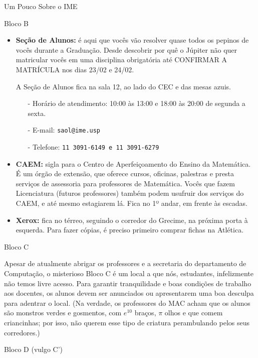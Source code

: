 \begin{secao}{Um Pouco Sobre o IME}
\begin{subsecao}{Bloco B}
\begin{itemize}
\item {\bf Seção de Alunos:} é aqui que vocês vão resolver quase todos os pepinos 
de vocês durante a Graduação. Desde descobrir por quê o Júpiter não quer matricular vocês
em uma disciplina obrigatória até CONFIRMAR A MATRÍCULA nos dias 23/02 e 24/02. %

A Seção de Alunos fica na sala 12, ao lado do CEC e das mesas azuis.
\begin{itemize}
\item[-] Horário de atendimento: 10:00 às 13:00 e 18:00 às 20:00 de segunda a sexta.
\item[-] E-mail: \tt{saol@ime.usp}
\item[-] Telefone: \tt{11 3091-6149} e \tt{11 3091-6279}
\end{itemize}

\item {\bf CAEM:} sigla para o Centro de Aperfeiçoamento do Ensino da Matemática.
É um órgão de extensão, que oferece cursos, oficinas, palestras e presta serviços
de assessoria para professores de Matemática. Vocês que fazem Licenciatura (futuros 
professores) também podem usufruir dos serviços do CAEM, e até mesmo estagiarem lá. 
Fica no 1º andar, em frente às escadas.

\item{\bf Xerox:} fica no térreo, seguindo o corredor do Grecime, na próxima
                  porta à esquerda. Para fazer cópias, é preciso primeiro
                  comprar fichas na Atlética.
\end{itemize}
\end{subsecao}

\begin{subsecao}{Bloco C}

Apesar de atualmente abrigar os professores e a secretaria do departamento de
Computação, o misterioso Bloco C é um local a que nós, estudantes, infelizmente não
temos livre acesso. Para garantir tranquilidade e boas condições de trabalho aos
docentes, os alunos devem ser anunciados ou apresentarem uma boa desculpa para 
adentrar o local. (Na verdade, os professores do MAC acham que os alunos são monstros
verdes e gosmentos, com $e^{10}$ braços, $\pi$ olhos e que comem criancinhas;
por isso, não querem esse tipo de criatura perambulando pelos seus corredores.)

\end{subsecao}

\begin{subsecao}{Bloco D (vulgo C')}


\end{subsecao}
\end{secao}

